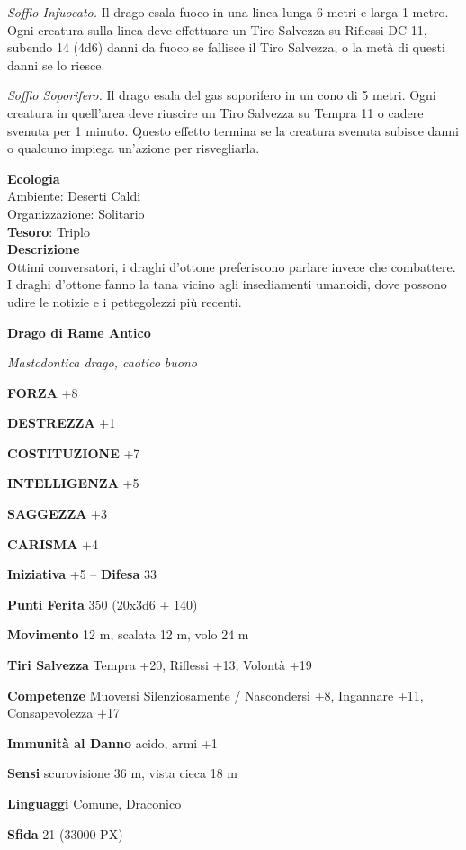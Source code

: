 \begin{multicols}{2}
	\textit{Soffio Infuocato.} Il drago esala fuoco in una linea lunga 6 metri e larga 1 metro. Ogni creatura sulla linea deve effettuare un Tiro Salvezza su Riflessi DC 11, subendo 14 (4d6) danni da fuoco se fallisce il Tiro Salvezza, o la metà di questi danni se lo riesce.

	\textit{Soffio Soporifero.} Il drago esala del gas soporifero in un cono di 5 metri. Ogni creatura in quell'area deve riuscire un Tiro Salvezza su Tempra 11 o cadere svenuta per 1 minuto. Questo effetto termina se la creatura svenuta subisce danni o qualcuno impiega un'azione per risvegliarla.

	\textbf{Ecologia}\\
	Ambiente: Deserti Caldi\\
	Organizzazione: Solitario\\
	\textbf{Tesoro}: Triplo\\
	\textbf{Descrizione}\\
	Ottimi conversatori, i draghi d'ottone preferiscono parlare invece che combattere. I draghi d'ottone fanno la tana vicino agli insediamenti umanoidi, dove possono udire le notizie e i pettegolezzi più recenti.


	\medskip{}\textbf{Drago di Rame Antico}

	\textit{Mastodontica drago, caotico buono}

	\textbf{FORZA} +8

	\textbf{DESTREZZA} +1

	\textbf{COSTITUZIONE} +7

	\textbf{INTELLIGENZA} +5

	\textbf{SAGGEZZA} +3

	\textbf{CARISMA} +4

	\textbf{Iniziativa} +5 -- \textbf{Difesa} 33

	\textbf{Punti Ferita} 350 (20x3d6 + 140)

	\textbf{Movimento} 12 m, scalata 12 m, volo 24 m

	\textbf{Tiri Salvezza} Tempra +20, Riflessi +13, Volontà +19

	\textbf{Competenze} Muoversi Silenziosamente / Nascondersi +8, Ingannare +11, Consapevolezza +17

	\textbf{Immunità al Danno} acido, armi +1

	\textbf{Sensi} scurovisione 36 m, vista cieca 18 m

	\textbf{Linguaggi} Comune, Draconico

	\textbf{Sfida} 21 (33000 PX)


\end{multicols}

